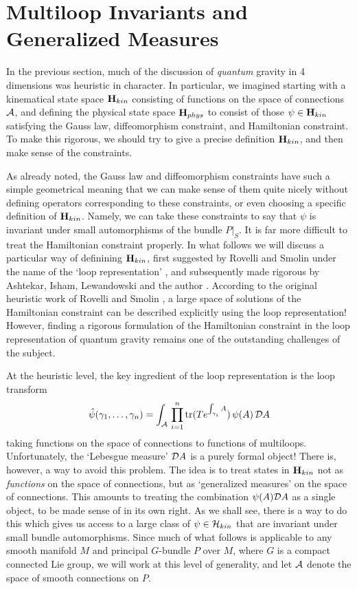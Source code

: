 \section{Multiloop Invariants and Generalized Measures}

In the previous section, much of the discussion of {\it quantum} gravity
in 4 dimensions was heuristic in character.  In particular, we imagined
starting with a kinematical state space ${\bf H}_{kin}$ consisting of
functions on the space of connections $\A$, and defining the physical
state space ${\bf H}_{phys}$ to consist of those $\psi \in {\bf
H}_{kin}$ satisfying the Gauss law, diffeomorphism constraint, and
Hamiltonian constraint.  To make this rigorous, we should try to
give a precise definition ${\bf H}_{kin}$, and then make sense of the
constraints.

As already noted, the Gauss law and diffeomorphism constraints have such
a simple geometrical meaning that we can make sense of them quite nicely
without defining operators corresponding to these constraints, or even
choosing a specific definition of ${\bf H}_{kin}$.  Namely, we can take
these constraints to say that $\psi$ is invariant under small
automorphisms of the bundle $P|_{S}$.  It is far more difficult to treat
the Hamiltonian constraint properly.  In what follows we will discuss a
particular way of definining ${\bf H}_{kin}$, first suggested by Rovelli
and Smolin under the name of the `loop representation' \cite{RS}, and
subsequently made rigorous by Ashtekar, Isham, Lewandowski and the
author \cite{AI,AL,Baez2,Baez2.5,Baez3}.  According to the original
heuristic work of Rovelli and Smolin \cite{RS}, a large space of
solutions of the Hamiltonian constraint can be described explicitly
using the loop representation!  However, finding a rigorous formulation
of the Hamiltonian constraint in the loop representation of quantum
gravity remains one of the outstanding challenges of the subject.

At the heuristic level, the
key ingredient of the loop representation is the loop transform
\[      \hat\psi(\gamma_1, \dots, \gamma_n) =
\int_{\A} \,\prod_{i=1}^n \tr(T e^{\int_{\gamma_i} A}) \, \psi(A)\,
{\cal D}A\]
taking functions on the space of connections to functions of multiloops.
Unfortunately, the `Lebesgue measure' ${\cal D}A$ is a purely formal
object!  There is, however, a way to avoid this problem.  The idea is to
treat states in ${\bf H}_{kin}$ not as {\it functions} on the space of
connections, but as `generalized measures' on the space of connections.
This amounts to treating the combination $\psi(A) {\cal D}A$ as a single
object, to be made sense of in its own right.  As we shall see, there is
a way to do this which gives us access to a large class of $\psi \in
\H_{kin}$ that are invariant under small bundle automorphisms.  Since
much of what follows is applicable to any smooth manifold $M$ and
principal $G$-bundle $P$ over $M$, where $G$ is a compact connected Lie
group, we will work at this level of generality, and let $\A$ denote the
space of smooth connections on $P$.

